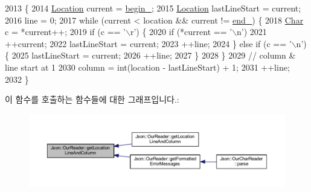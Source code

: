 \begin{DoxyCode}
2013                                                          \{
2014   \hyperlink{class_json_1_1_our_reader_a1bdc7bbc52ba87cae6b19746f2ee0189}{Location} current = \hyperlink{class_json_1_1_our_reader_a9bda9d72335d52cd06e65f9eca3f70f5}{begin\_};
2015   \hyperlink{class_json_1_1_our_reader_a1bdc7bbc52ba87cae6b19746f2ee0189}{Location} lastLineStart = current;
2016   line = 0;
2017   \textcolor{keywordflow}{while} (current < location && current != \hyperlink{class_json_1_1_our_reader_ab1f69b0260c27a0d2d65dc56e42c8f9d}{end\_}) \{
2018     \hyperlink{class_json_1_1_our_reader_a0cd0bab4caa66594ab843ccd5f9dc239}{Char} c = *current++;
2019     \textcolor{keywordflow}{if} (c == \textcolor{charliteral}{'\(\backslash\)r'}) \{
2020       \textcolor{keywordflow}{if} (*current == \textcolor{charliteral}{'\(\backslash\)n'})
2021         ++current;
2022       lastLineStart = current;
2023       ++line;
2024     \} \textcolor{keywordflow}{else} \textcolor{keywordflow}{if} (c == \textcolor{charliteral}{'\(\backslash\)n'}) \{
2025       lastLineStart = current;
2026       ++line;
2027     \}
2028   \}
2029   \textcolor{comment}{// column & line start at 1}
2030   column = int(location - lastLineStart) + 1;
2031   ++line;
2032 \}
\end{DoxyCode}
이 함수를 호출하는 함수들에 대한 그래프입니다.\+:\nopagebreak
\begin{figure}[H]
\begin{center}
\leavevmode
\includegraphics[width=350pt]{class_json_1_1_our_reader_af482c8e718615646e13a996292e18d74_icgraph}
\end{center}
\end{figure}
\mbox{\label{class_json_1_1_our_reader_ac129e94cdc260822b2fd24e2ca35e636}} 
